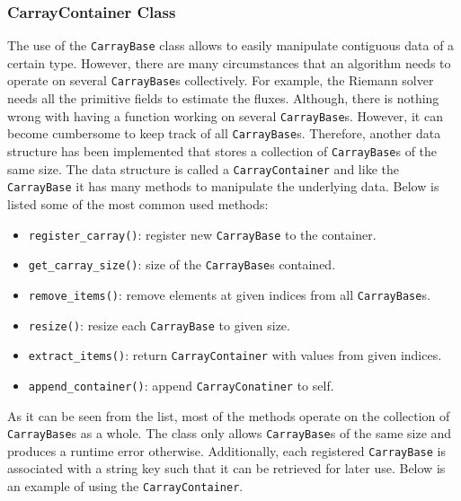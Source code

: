 \subsubsection{CarrayContainer Class}
\label{sec.carraycontainer}
The use of the \lstinline{CarrayBase} class allows to easily manipulate contiguous data of a certain
type. However, there are many circumstances that an algorithm needs to operate on several 
\lstinline{CarrayBase}s collectively. For example, the Riemann solver needs all the primitive fields
to estimate the fluxes. Although, there is nothing wrong with having a function working on
several \lstinline{CarrayBase}s. However, it can become cumbersome to keep track of all
\lstinline{CarrayBase}s.
Therefore, another data structure has been implemented that stores a collection
of \lstinline{CarrayBase}s of the same size. The data structure is called a \lstinline{CarrayContainer}
and like the \lstinline{CarrayBase} it has many methods to manipulate the underlying data.
Below is listed some of the most common used methods:
\begin{itemize}
	\item \lstinline{register_carray()}: register new \lstinline{CarrayBase} to the container.
	\item \lstinline{get_carray_size()}: size of the \lstinline{CarrayBase}s contained.
    \item \lstinline{remove_items()}: remove elements at given indices from all \lstinline{CarrayBase}s.
    \item \lstinline{resize()}: resize each \lstinline{CarrayBase} to given size.
    \item \lstinline{extract_items()}: return \lstinline{CarrayContainer} with values from given indices.
    \item \lstinline{append_container()}: append \lstinline{CarrayConatiner} to self.
\end{itemize}
As it can be seen from the list, most of the methods operate on the collection of \lstinline{CarrayBase}s
as a whole. The class only allows \lstinline{CarrayBase}s of the same size and produces a runtime error 
otherwise. Additionally, each registered \lstinline{CarrayBase} is associated with a string key such
that it can be retrieved for later use. Below is an example of using the \lstinline{CarrayContainer}.

